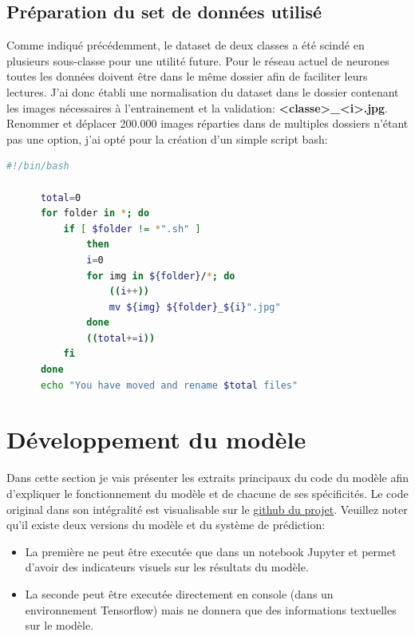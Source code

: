\documentclass[a4paper,12pt]{report}
\begin{document}
      \subsection{Préparation du set de données utilisé}
      Comme indiqué précédemment, le dataset de deux classes a été scindé en plusieurs sous-classe pour une utilité future. Pour le réseau actuel de neurones toutes les données doivent être dans le même dossier afin de faciliter leurs lectures.
      \medbreak
      J'ai donc établi une normalisation du dataset dans le dossier contenant les images nécessaires à l'entrainement et la validation: \textbf{<classe>\_<i>.jpg}. Renommer et déplacer 200.000 images réparties dans de multiples dossiers n'étant pas une option, j'ai opté pour la création d'un simple script bash:
      \begin{lstlisting}[language=Bash, title=mvIterator.sh]
      #!/bin/bash

      total=0
      for folder in *; do
          if [ $folder != *".sh" ]
              then
              i=0
              for img in ${folder}/*; do
                  ((i++))
                  mv ${img} ${folder}_${i}".jpg"    
              done
              ((total+=i))
          fi
      done
      echo "You have moved and rename $total files"
      \end{lstlisting}

    \section{Développement du modèle}
    Dans cette section je vais présenter les extraits principaux du code du modèle afin d'expliquer le fonctionnement du modèle et de chacune de ses spécificités. Le code original dans son intégralité est visualisable sur le \href{<https://github.com/plabadille/cookedDishRecognizer/blob/master/cookedDishModel.py>}{github du projet}. Veuillez noter qu'il existe deux versions du modèle et du système de prédiction: 
    \begin{itemize}
      \item La première ne peut être executée que dans un notebook Jupyter et permet d'avoir des indicateurs visuels sur les résultats du modèle.
      \item La seconde peut être executée directement en console (dans un environnement Tensorflow) mais ne donnera que des informations textuelles sur le modèle.
    \end{itemize}
\end{document}
